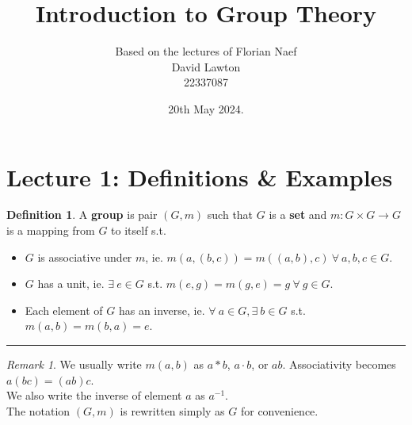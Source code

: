 \documentclass{article}
\title{Introduction to Group Theory}
\author{Based on the lectures of Florian Naef\\David Lawton\\22337087}
\date{20th May 2024.}
\theoremstyle{definition}
\newtheorem{definition}{Definition}[section]
\theoremstyle{remark}
\newtheorem*{remark}{Remark}
\begin{document}
\maketitle
\vfill
\tableofcontents

\newpage

\section{Lecture 1: Definitions \& Examples}
\begin{definition}
 A \textbf{group} is pair $(G,m)$ such that $G$ is a \textbf{set} and $m: G\times G \rightarrow G$ is a mapping from $G$ to itself s.t.
 \end{definition}
\begin{itemize}
\item $G$ is associative under $m$, ie. $m(a,(b,c))=m((a,b),c) ~\forall ~a,b,c\in G$.
\item $G$ has a unit, ie. $\exists ~e\in G$ s.t. $ m(e,g)=m(g,e)=g~\forall ~ g\in G$.
\item Each element of $G$ has an inverse, ie. $\forall~a\in G, \exists ~b\in G$ s.t. $ m(a,b)=m(b,a)=e$.
\end{itemize}
\hrule
\vspace{3mm}
\begin{remark}
We usually write $m(a,b)$ as $a*b$, $ a\cdot b$, or $ab$. Associativity becomes $a(bc)=(ab)c$. \\ We also write the inverse of element $a$ as $a^{-1}$. \\ The notation $(G,m) $ is rewritten simply as $G$ for convenience.\\
\end{remark}
\end{document}
